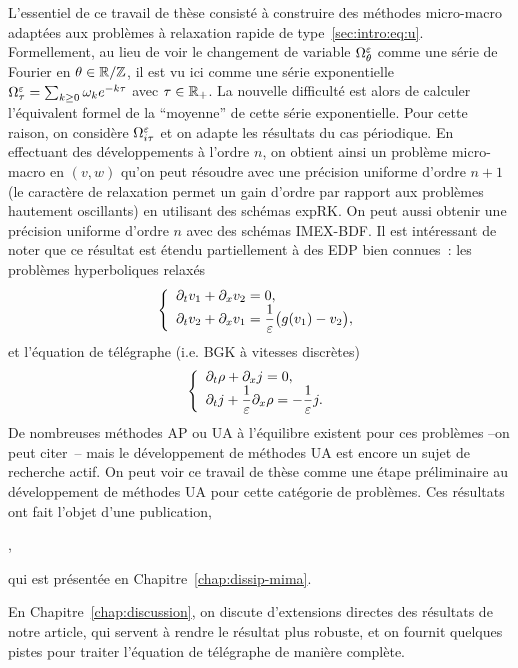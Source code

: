 L'essentiel de ce travail de thèse consisté à construire des méthodes micro-macro adaptées aux problèmes à relaxation rapide de type~\eqref{sec:intro:eq:u}. Formellement, au lieu de voir le changement de variable $\Omega^{\varepsilon}_\theta$ comme une série de Fourier en $\theta \in \mathbb{R}/\mathbb{Z}$, il est vu ici comme une série exponentielle $\Omega^{\varepsilon}_\tau = \sum_{k \geq 0} \omega_k e^{-k\tau}$ avec $\tau \in \mathbb{R}_+$. La nouvelle difficulté est alors de calculer l'équivalent formel de la \enquote{moyenne} de cette série exponentielle. Pour cette raison, on considère $\Omega^{\varepsilon}_{i\tau}$ et on adapte les résultats du cas périodique. En effectuant des développements à l'ordre $n$, on obtient ainsi un problème micro-macro en $(v,w)$ qu'on peut résoudre avec une précision uniforme d'ordre $n+1$ (le caractère de relaxation permet un gain d'ordre par rapport aux problèmes hautement oscillants) en utilisant des schémas expRK. On peut aussi obtenir une précision uniforme d'ordre $n$ avec des schémas IMEX-BDF. Il est intéressant de noter que ce résultat est étendu partiellement à des EDP bien connues~: les problèmes hyperboliques relaxés
\begin{equation*}
    \left\{ \begin{array}{l} \displaystyle
    \partial_t v_1 + \partial_x v_2 = 0 , \\ \displaystyle
    \partial_t v_2 + \partial_x v_1 = \frac{1}{\varepsilon} \big( g(v_1) - v_2 \big) ,
    \end{array} \right .
\end{equation*}
et l'équation de télégraphe (i.e. BGK à vitesses discrètes)
\begin{equation*}
    \left\{ \begin{array}{l} \displaystyle
    \partial_t \rho + \partial_x j = 0, \\ \displaystyle
    \partial_t j + \frac{1}{\varepsilon}\partial_x \rho = -\frac{1}{\varepsilon} j .
\end{array} \right .
\end{equation*}
De nombreuses méthodes AP ou UA à l'équilibre existent pour ces problèmes --on peut citer~\cite{jin.1999.efficient,lemou.2008.new,dimarco.2011.exponential,dimarco.2017.implicit,boscarino.2017.unified,albi.2020.implicit}-- mais le développement de méthodes UA est encore un sujet de recherche actif. On peut voir ce travail de thèse comme une étape préliminaire au développement de méthodes UA pour cette catégorie de problèmes. Ces résultats ont fait l'objet d'une publication, 
\begin{center}\begin{minipage}{.75\textwidth}
    \noindent
    ,
\end{minipage}\end{center}
qui est présentée en Chapitre~\ref{chap:dissip-mima}. 

En Chapitre~\ref{chap:discussion}, on discute d'extensions directes des résultats de notre article, qui servent à rendre le résultat plus robuste, et on fournit quelques pistes pour traiter l'équation de télégraphe de manière complète. 